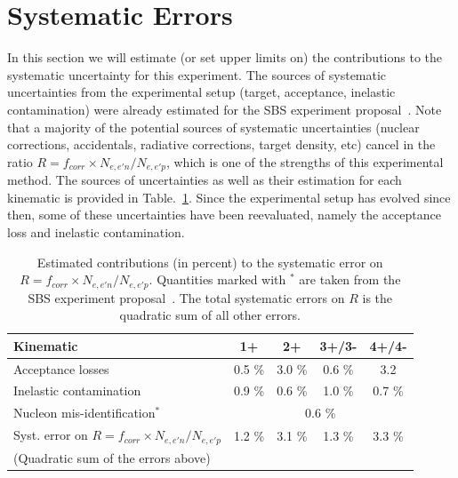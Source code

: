 \section{Systematic Errors}

In this section we will estimate (or set upper limits on) the contributions to the systematic uncertainty for this experiment.
The sources of systematic uncertainties from the experimental setup (target, acceptance, inelastic contamination) were already estimated for the SBS \gmn experiment proposal~\cite{E12-09-019}.
Note that a majority of the potential sources of systematic uncertainties (nuclear corrections, accidentals, radiative corrections, target density, etc) cancel in the ratio $R = f_{corr} \times N_{e,e'n}/N_{e,e'p}$, which is one of the strengths of this experimental method.
The sources of uncertainties as well as their estimation for each kinematic is provided in Table.~\ref{r_systematic_summary}.
Since the experimental setup has evolved since then, some of these uncertainties have been reevaluated, namely the acceptance loss and inelastic contamination.
%
\begin{table}[!h]
\begin{center}
\caption{
  Estimated contributions (in percent) to the systematic error on $R = f_{corr} \times N_{e,e'n}/N_{e,e'p}$.  
  Quantities marked with $^*$ are taken from the SBS \gmn experiment proposal~\cite{E12-09-019}.
  The total systematic errors on $R$ is the quadratic sum of all other errors.
}
\label{r_systematic_summary}
\vspace{.2in}
{\begin{tabular}{|l|c|c|c|c|}
\hline
\hline
 Kinematic & {\bf 1+} & {\bf 2+} & {\bf 3+}/{\bf 3-} & {\bf 4+}/{\bf 4-}\\
\hline
\hline
Acceptance losses & 0.5 \% & 3.0 \% & 0.6 \% & 3.2 \\
\hline
Inelastic contamination & 0.9 \% & 0.6 \% & 1.0 \% & 0.7 \% \\
\hline
Nucleon mis-identification$^*$ & \multicolumn{4}{|c|}{0.6 \% } \\
\hline
\hline
Syst. error on $R = f_{corr} \times N_{e,e'n}/N_{e,e'p}$ & 1.2 \%  & 3.1 \% & 1.3 \%  & 3.3 \%  \\
(Quadratic sum of the errors above) & & & &  \\
\hline
\hline
\end{tabular}}
\end{center}
\end{table}
